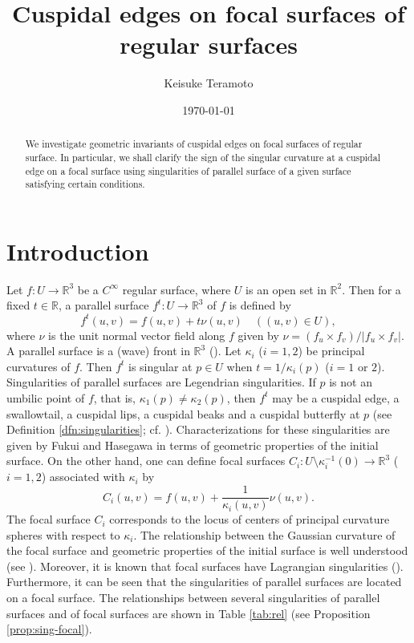 \documentclass[11pt,a4paper,pdflatex,final]{amsart}
\title[Cuspidal edges on focal surface]
{Cuspidal edges on focal surfaces of regular surfaces}
\author[K. Teramoto]{Keisuke Teramoto}
\date{\today}
\theoremstyle{plain}
\theoremstyle{definition}
\theoremstyle{remark}
\newcommand{\0}{\bm{0}}
\newcommand{\R}{\mathbb{R}}
\numberwithin{equation}{section}
\begin{document}
	
	
	\begin{abstract}
	We investigate geometric invariants of cuspidal edges 
	on focal surfaces of regular surface. 
	In particular, we shall clarify the sign of the singular curvature 
	at a cuspidal edge on a focal surface using singularities of 
	parallel surface of a given surface satisfying certain conditions. 
	\end{abstract}
	
	\maketitle
	
\section{Introduction}
Let $f\colon U\to\R^3$ be a $C^\infty$ regular surface, 
where $U$ is an open set in $\R^2$. 
Then for a fixed $t\in\R$, a parallel surface 
$f^t\colon U\to\R^3$ of $f$ is defined by 
\[
f^t(u,v)=f(u,v)+t\nu(u,v)\quad  ((u,v)\in U),
\]
where $\nu$ is the unit normal vector field along $f$ 
given by $\nu=(f_u\times f_v)/|f_u\times f_v|$. 
A parallel surface is a (wave) front in $\R^3$ (\cite{agv,bruce,usy-book}). 
Let $\kappa_i$ ($i=1,2$) be principal curvatures of $f$. 
Then $f^t$ is singular at $p\in U$ when $t=1/\kappa_i(p)$ ($i=1$ or $2$). 
Singularities of parallel surfaces are Legendrian singularities. 
If $p$ is not an umbilic point of $f$, 
that is, $\kappa_1(p)\neq \kappa_2(p)$, 
then $f^t$ may be a cuspidal edge, a swallowtail, 
a cuspidal lips, a cuspidal beaks and a cuspidal butterfly at $p$ 
(see Definition \ref{dfn:singularities}; cf. \cite[Chapters 21 and 22]{agv}). 
Characterizations for these singularities are given by Fukui and Hasegawa 
\cite[Theorems 3.4 and 3.5]{fh-para} 
in terms of geometric properties of the initial surface. 
On the other hand, 
one can define focal surfaces $C_i\colon U\setminus\kappa_i^{-1}(0)\to\R^3$ ($i=1,2$) 
associated with $\kappa_i$ by 
\[
C_i(u,v)=f(u,v)+\frac{1}{\kappa_i(u,v)}\nu(u,v).
\]
The focal surface $C_i$ corresponds to the locus of 
centers of principal curvature spheres with respect to $\kappa_i$. 
The relationship between the Gaussian curvature 
of the focal surface and geometric properties of the initial surface 
is well understood (see \cite[page 183]{eisen}). 
Moreover, it is known that focal surfaces have Lagrangian singularities (\cite[Chapter 21]{agv}). 
Furthermore, it can be seen that the singularities of parallel surfaces 
are located on a focal surface. 
The relationships between several singularities of parallel surfaces 
and of focal surfaces are shown in Table \ref{tab:rel} 
(see Proposition \ref{prop:sing-focal}).		
\end{document}
